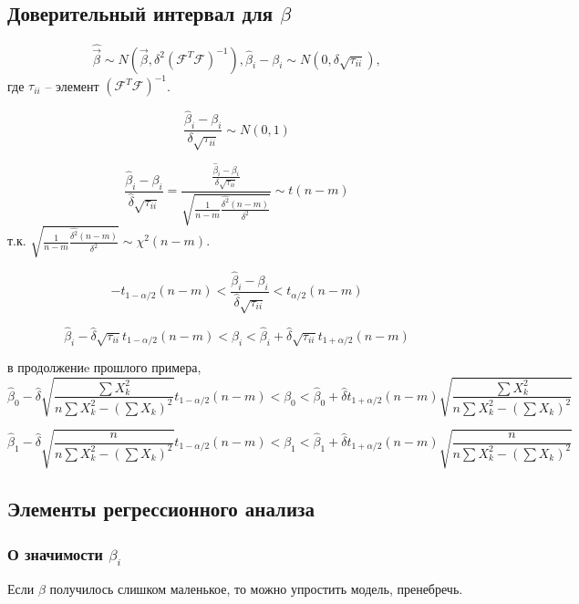 \subsection{Доверительный интервал для $\beta$}

\[
  \hat{\vec{\beta}} \sim N\left(\vec{\beta}, \delta^2 (\mathcal{F}^T \mathcal{F})^{-1}\right),
  \hat{\beta}_i - \beta_i \sim N(0, \delta \sqrt{\tau_{ii}}),
\]
где $\tau_{ii}$ -- элемент $(\mathcal{F}^T \mathcal{F})^{-1}$.

\[
  \frac{\hat{\beta}_i - \beta_i}{\delta \sqrt{\tau_{ii}}} \sim N(0, 1)
\]

\[ 
  \frac{\hat{\beta}_i - \beta_i}{\hat{\delta} \sqrt{\tau_{ii}}}
  = \frac
  { \frac{\hat{\beta}_i - \beta_i}{\delta \sqrt{\tau_{ii}}} }
  { \sqrt{ \frac{1}{n-m} \frac{\hat{\delta^2} (n-m)}{\delta^2} } }
  \sim t(n-m)
\]
т.к. $ \sqrt{ \frac{1}{n-m} \frac{\hat{\delta^2} (n-m)}{\delta^2} } \sim \chi^2(n-m) $.

\[
  -t_{1-\alpha/2} (n-m) <
  \frac{\hat{\beta}_i - \beta_i}{\hat{\delta} \sqrt{\tau_{ii}}}
  < t_{\alpha/2} (n-m)
\]

\[
  \hat{\beta}_i - \hat{\delta} \sqrt{\tau_{ii}} t_{1-\alpha/2} (n-m) < 
  \beta_i <
  \hat{\beta}_i + \hat{\delta} \sqrt{\tau_{ii}} t_{1 + \alpha/2} (n-m)
\]

\begin{ex}
  в продолжениe прошлого примера,
  \[
    \hat{\beta}_0 - \hat{\delta} \sqrt{ \frac{\sum X_k^2}{n \sum{X_k^2} - \left( \sum X_k \right)^2 } } t_{1-\alpha/2} (n-m) < 
    \beta_0 <
    \hat{\beta}_0 + \hat{\delta} t_{1 + \alpha/2} (n-m) \sqrt{ \frac{\sum X_k^2}{n \sum{X_k^2} - \left( \sum X_k \right)^2 } }
  \]
  
  \[
    \hat{\beta}_1 - \hat{\delta} \sqrt{ \frac{n}{n \sum{X_k^2} - \left( \sum X_k \right)^2 } } t_{1-\alpha/2} (n-m) < 
    \beta_1 <
    \hat{\beta}_1 + \hat{\delta} t_{1 + \alpha/2} (n-m) \sqrt{ \frac{n}{n \sum{X_k^2} - \left( \sum X_k \right)^2 } }
  \]
\end{ex}

\subsection{Элементы регрессионного анализа}

\subsubsection{О значимости $\beta_i$}
Если $\beta$ получилось слишком маленькое, то можно упростить модель, пренебречь.

